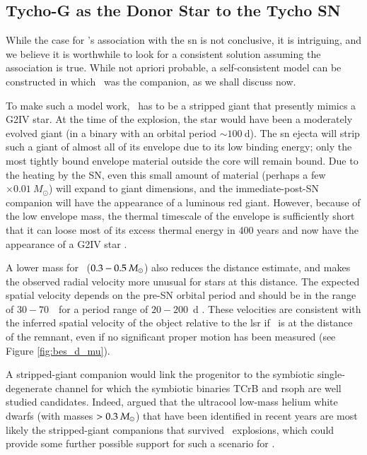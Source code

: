\subsection{Tycho-G as the Donor Star to the Tycho SN}
\label{redgiant}


While the case for \starg's association with the \gls*{sn} is not conclusive, it is intriguing, and we believe it is worthwhile to look for a consistent solution assuming the association is true.
While not {apriori} probable, a self-consistent model can be constructed in which \starg\ was the companion, as we shall discuss now.

To make such a model work, \starg\ has to be a stripped giant that
presently mimics a G2IV star. At the time of the explosion, the star
would have been a moderately evolved giant (in a binary with an
orbital period $\sim 100~$d). The \gls*{sn} ejecta will strip such a giant
of almost all of its envelope \citep{2000ApJS..128..615M} due to its low binding energy; only the most tightly bound envelope material
outside the core will remain bound. Due to the heating by the SN,
even this small amount of material (perhaps a few $\times
0.01~M_{\odot}$) will expand to giant dimensions, and the
immediate-post-SN companion will have the appearance of a luminous red
giant. However, because of the low envelope mass, the thermal
timescale of the envelope is sufficiently short that it can loose most
of its excess thermal energy in 400 years and now have the appearance
of a G2IV star \citep{2003astro.ph..3660P}.

A lower mass for \starg\ ($0.3-0.5~\hbox{$M_{\odot}$}$) also
reduces the distance estimate, and makes the observed radial velocity more unusual for stars at this distance.
The expected spatial velocity depends on the
pre-SN orbital period and should be in the range of
$30-70$~\kms\ for a period range of $20-200$~d \citep[]{Justham:2008nx}. These velocities are consistent with the
inferred spatial velocity of the object relative to the \gls{lsr} if \starg\
is at the distance of the remnant, even if no significant proper motion has been measured (see Figure \ref{fig:bes_d_mu}).

A stripped-giant companion would link the progenitor to the symbiotic
single-degenerate channel \citep{1999ApJ...522..487H} for which the
symbiotic binaries TCrB and \gls{rsoph} are well studied
candidates. Indeed, \citep[]{Justham:2008nx} argued that
the ultracool low-mass helium white dwarfs (with masses $>
0.3~\hbox{$M_{\odot}$}$) that have been identified in recent years are most
likely the stripped-giant companions that survived \snia\ explosions, 
which could provide some further possible support for such a scenario for
\starg.

